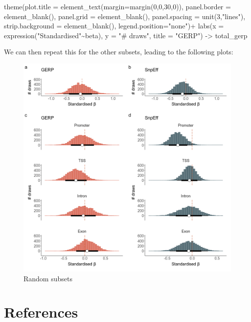 \documentclass[
  letterpaper,
  DIV=11,
  numbers=noendperiod]{scrreprt}
\newenvironment{Shaded}{}{}
\newcommand{\AttributeTok}[1]{\textcolor[rgb]{0.84,0.23,0.29}{#1}}
\newcommand{\DecValTok}[1]{\textcolor[rgb]{0.00,0.36,0.77}{#1}}
\newcommand{\FunctionTok}[1]{\textcolor[rgb]{0.44,0.26,0.76}{#1}}
\newcommand{\NormalTok}[1]{\textcolor[rgb]{0.14,0.16,0.18}{#1}}
\newcommand{\OtherTok}[1]{\textcolor[rgb]{0.44,0.26,0.76}{#1}}
\newcommand{\SpecialCharTok}[1]{\textcolor[rgb]{0.00,0.36,0.77}{#1}}
\newcommand{\StringTok}[1]{\textcolor[rgb]{0.01,0.18,0.38}{#1}}
\begin{document}
\begin{Shaded}
\begin{Highlighting}[]
  \FunctionTok{theme}\NormalTok{(}\AttributeTok{plot.title =} \FunctionTok{element\_text}\NormalTok{(}\AttributeTok{margin=}\FunctionTok{margin}\NormalTok{(}\DecValTok{0}\NormalTok{,}\DecValTok{0}\NormalTok{,}\DecValTok{30}\NormalTok{,}\DecValTok{0}\NormalTok{)),}
        \AttributeTok{panel.border =} \FunctionTok{element\_blank}\NormalTok{(),}
        \AttributeTok{panel.grid =} \FunctionTok{element\_blank}\NormalTok{(),}
        \AttributeTok{panel.spacing =} \FunctionTok{unit}\NormalTok{(}\DecValTok{3}\NormalTok{,}\StringTok{"lines"}\NormalTok{),}
        \AttributeTok{strip.background =} \FunctionTok{element\_blank}\NormalTok{(),}
        \AttributeTok{legend.position=}\StringTok{"none"}\NormalTok{)}\SpecialCharTok{+}
  \FunctionTok{labs}\NormalTok{(}\AttributeTok{x =} \FunctionTok{expression}\NormalTok{(}\StringTok{"Standardised"}\SpecialCharTok{\textasciitilde{}}\NormalTok{beta), }\AttributeTok{y =} \StringTok{"\# draws"}\NormalTok{, }\AttributeTok{title =} \StringTok{"GERP"}\NormalTok{) }\OtherTok{{-}\textgreater{}}\NormalTok{ total\_gerp}
\end{Highlighting}
\end{Shaded}

We can then repeat this for the other subsets, leading to the following
plots:

\begin{figure}

{\centering \includegraphics{qmd/../plots/sup/extended_3_random_draws.png}

}

\caption{Random subsets}

\end{figure}


\hypertarget{references}{%
\chapter*{References}\label{references}}


\printbibliography[heading=none]
\end{document}

